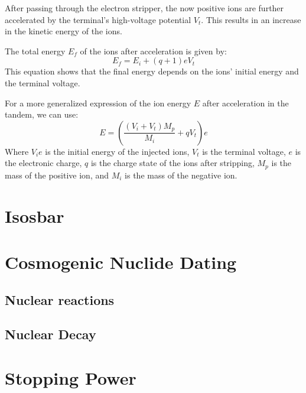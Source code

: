 After passing through the electron stripper, the now positive ions are further accelerated by the terminal's high-voltage potential $V_{t}$. This results in an increase in the kinetic energy of the ions.

The total energy $E_f$ of the ions after acceleration is given by:
\begin{equation}
    E_f = E_i + (q + 1)eV_t
    \label{ionenergyafteracc}
\end{equation}
This equation shows that the final energy depends on the ions' initial energy and the terminal voltage.

For a more generalized expression of the ion energy $E$ after acceleration in the tandem, we can use:
\begin{equation}
    E = \left( \frac{(V_i + V_t) M_p}{M_i} + q V_t \right) e
    \label{higenergysection}
\end{equation}
Where $V_{i} e$ is the initial energy of the injected ions, $V_{t}$ is the terminal voltage, $e$ is the electronic charge, $q$ is the charge state of the ions after stripping, $M_p$ is the mass of the positive ion, and $M_{i}$ is the mass of the negative ion.


\section{Isosbar}

\section{Cosmogenic Nuclide Dating}
\subsection{Nuclear reactions}
\subsection{Nuclear Decay}

\section{Stopping Power}